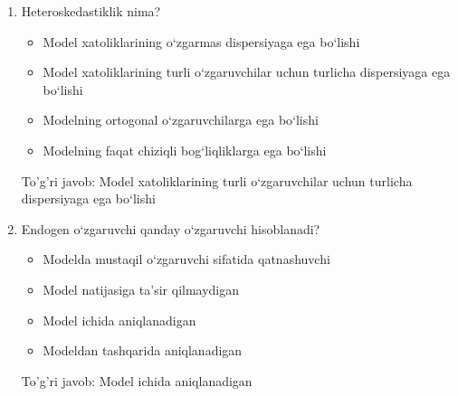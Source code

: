 \documentclass[a4paper,12pt]{article}
\begin{document}
\begin{enumerate}[label=\arabic*.]
    \item Heteroskedastiklik nima?
    \begin{itemize}
        \item Model xatoliklarining o‘zgarmas dispersiyaga ega bo‘lishi
        \item Model xatoliklarining turli o‘zgaruvchilar uchun turlicha dispersiyaga ega bo‘lishi
        \item Modelning ortogonal o‘zgaruvchilarga ega bo‘lishi
        \item Modelning faqat chiziqli bog‘liqliklarga ega bo‘lishi
    \end{itemize}
    To'g'ri javob: Model xatoliklarining turli o‘zgaruvchilar uchun turlicha dispersiyaga ega bo‘lishi

    \item Endogen o‘zgaruvchi qanday o‘zgaruvchi hisoblanadi?
    \begin{itemize}
        \item Modelda mustaqil o‘zgaruvchi sifatida qatnashuvchi
        \item Model natijasiga ta'sir qilmaydigan
        \item Model ichida aniqlanadigan
        \item Modeldan tashqarida aniqlanadigan
    \end{itemize}
    To'g'ri javob: Model ichida aniqlanadigan


\end{enumerate}
\end{document}

